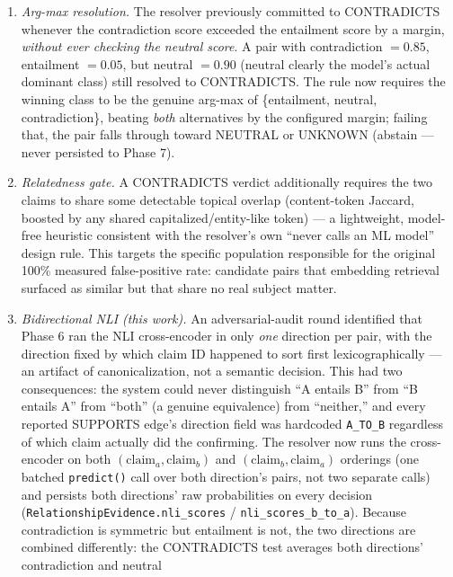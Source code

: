 \begin{enumerate}
  \item \emph{Arg-max resolution.} The resolver previously committed to
    CONTRADICTS whenever the contradiction score exceeded the entailment
    score by a margin, \emph{without ever checking the neutral score}. A
    pair with contradiction $=0.85$, entailment $=0.05$, but neutral
    $=0.90$ (neutral clearly the model's actual dominant class) still
    resolved to CONTRADICTS. The rule now requires the winning class to be
    the genuine arg-max of \{entailment, neutral, contradiction\}, beating
    \emph{both} alternatives by the configured margin; failing that, the
    pair falls through toward NEUTRAL or UNKNOWN (abstain --- never
    persisted to Phase 7).
  \item \emph{Relatedness gate.} A CONTRADICTS verdict additionally
    requires the two claims to share some detectable topical overlap
    (content-token Jaccard, boosted by any shared capitalized/entity-like
    token) --- a lightweight, model-free heuristic consistent with the
    resolver's own ``never calls an ML model'' design rule. This targets
    the specific population responsible for the original 100\% measured
    false-positive rate: candidate pairs that embedding retrieval surfaced
    as similar but that share no real subject matter.
  \item \emph{Bidirectional NLI (this work).} An adversarial-audit round
    identified that Phase 6 ran the NLI cross-encoder in only
    \emph{one} direction per pair, with the direction fixed by which claim
    ID happened to sort first lexicographically --- an artifact of
    canonicalization, not a semantic decision. This had two consequences:
    the system could never distinguish ``A entails B'' from ``B entails A''
    from ``both'' (a genuine equivalence) from ``neither,'' and every
    reported SUPPORTS edge's direction field was hardcoded
    \texttt{A\_TO\_B} regardless of which claim actually did the
    confirming. The resolver now runs the cross-encoder on both
    $(\mathrm{claim}_a, \mathrm{claim}_b)$ and $(\mathrm{claim}_b,
    \mathrm{claim}_a)$ orderings (one batched \texttt{predict()} call over
    both direction's pairs, not two separate calls) and persists both
    directions' raw probabilities on every decision
    (\texttt{RelationshipEvidence.nli\_scores} /
    \texttt{nli\_scores\_b\_to\_a}). Because contradiction is symmetric but
    entailment is not, the two directions are combined differently: the
    CONTRADICTS test averages both directions' contradiction and neutral

\end{enumerate}
